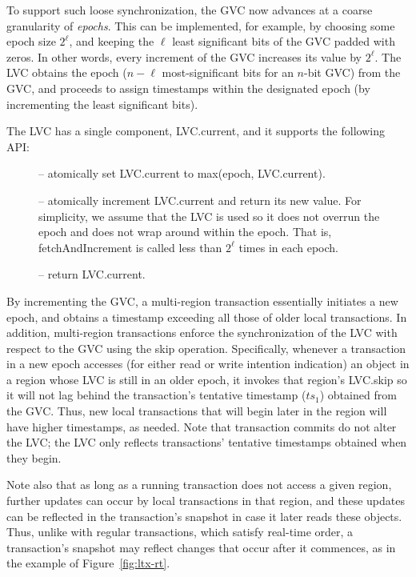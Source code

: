 To support such loose synchronization, the GVC now advances at a coarse
granularity of \emph{epochs}. This can be implemented, for example, by choosing some
epoch size $2^\ell$, and keeping the $\ell$ least significant bits of the GVC padded
with zeros. In other words, every increment of the GVC increases its value by
$2^\ell$.
The LVC obtains the epoch ($n-\ell$ most-significant bits for an $n$-bit GVC) from the
GVC, and proceeds to assign timestamps within the designated epoch (by
incrementing the least significant bits).

The LVC has a single component, LVC.current, and it supports the following API:
\begin{description}
\item[] -- atomically set LVC.current to max(epoch, LVC.current).

\item[] -- atomically increment LVC.current and return its new
value.
For simplicity, we assume that the LVC is used so it does not overrun the epoch
and does not wrap around within the epoch. That is, fetchAndIncrement is called
less than $2^\ell$ times in each epoch.

\item[] -- return LVC.current.
\end{description}

By incrementing the GVC, a multi-region transaction essentially initiates a new
epoch, and obtains a timestamp exceeding all those of older local transactions.
In addition, multi-region transactions enforce the synchronization of the LVC
with respect to the GVC using the skip operation. Specifically, whenever a
transaction in a new epoch accesses (for either read or write intention
indication) an object in a region whose LVC is still in an older epoch, it
invokes that region's LVC.skip so it will not lag behind the transaction's
tentative timestamp ($ts_1$) obtained from the GVC. Thus, new local transactions that will
begin later in the region will have higher timestamps, as needed.
Note that transaction commits do not alter the LVC; the LVC only reflects
transactions' tentative timestamps obtained when they  begin.

Note also that as long as a running transaction does not access a given region,
further updates can occur by local transactions in that region, and these
updates can be reflected in the transaction's snapshot in case it later reads
these objects. Thus, unlike with regular transactions, which satisfy real-time
order, a transaction's snapshot may reflect changes that occur after it
commences, as in the example of Figure~\ref{fig:ltx-rt}.

